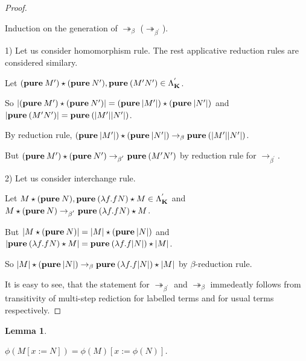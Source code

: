 \documentclass[a4paper]{article}
\newtheorem{lemma}{Lemma}
\begin{document}
\begin{proof}

$ $

Induction on the generation of $\twoheadrightarrow_{\beta}$ ($\twoheadrightarrow_{\beta^{'}}$).

1) Let us consider homomorphism rule. The rest applicative reduction rules are considered similary.

Let $({\bf pure \: } M') \star ({\bf pure \: } N'), {\bf pure \: } (M' N') \in \Lambda^{'}_{\textbf{K}}$.

So $|({\bf pure \: } M') \star ({\bf pure \: } N')| = ({\bf pure \: } |M'|) \star ({\bf pure \: } |N'|)$ and
$|{\bf pure \: } (M' N')| = {\bf pure \: } (|M'| |N'|)$.

By reduction rule, $({\bf pure \: } |M'|) \star ({\bf pure \: } |N'|) \rightarrow_{\beta} {\bf pure \: }
(|M'||N'|)$.

But $({\bf pure \: } M') \star ({\bf pure \: } N') \rightarrow_{\beta^{'}} {\bf pure \: } (M' N')$ by
reduction rule for $\rightarrow_{\beta^{'}}$.

  \vspace{\baselineskip}

2) Let us consider interchange rule.

Let $M \star ({\bf pure \: } N), {\bf pure \: } (\lambda f. f N) \star M \in \Lambda^{'}_{\textbf{K}}$ and
$M \star ({\bf pure \: } N) \rightarrow_{\beta^{'}} {\bf pure \: } (\lambda f. f N) \star M$.

But $|M \star ({\bf pure \: } N)| = |M| \star ({\bf pure \: } |N|)$ and $|{\bf pure \: } (\lambda f. f N)
\star M| = {\bf pure \: } (\lambda f. f |N|) \star |M|$.

So $|M| \star ({\bf pure \: } |N|) \rightarrow_{\beta} {\bf pure \: } (\lambda f. f |N|) \star |M|$ by
$\beta$-reduction rule.

\vspace{\baselineskip}

It is easy to see, that the statement for $\twoheadrightarrow_{\beta^{'}}$ and $\twoheadrightarrow_{\beta}$
immedeatly follows from transitivity of multi-step rediction for labelled terms and for usual terms
respectively.

\end{proof}

\begin{lemma}

$ $

$\phi(M [x := N]) = \phi(M) [x := \phi(N)]$.

\end{lemma}
\end{document}
